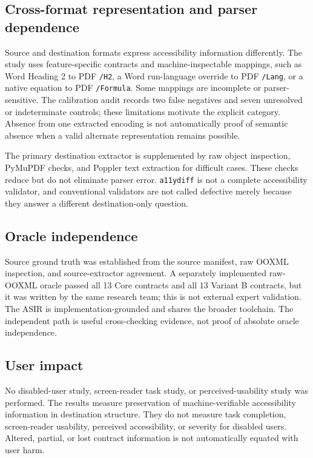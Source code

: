 \subsection{Cross-format representation and parser dependence}

Source and destination formats express accessibility information differently. The study uses feature-specific contracts and machine-inspectable mappings, such as Word Heading 2 to PDF \texttt{/H2}, a Word run-language override to PDF \texttt{/Lang}, or a native equation to PDF \texttt{/Formula}. Some mappings are incomplete or parser-sensitive. The calibration audit records two false negatives and seven unresolved or indeterminate controls; these limitations motivate the explicit \unresolved{} category. Absence from one extracted encoding is not automatically proof of semantic absence when a valid alternate representation remains possible.

The primary destination extractor is supplemented by raw object inspection, PyMuPDF checks, and Poppler text extraction for difficult cases. These checks reduce but do not eliminate parser error. \texttt{a11ydiff} is not a complete accessibility validator, and conventional validators are not called defective merely because they answer a different destination-only question.

\subsection{Oracle independence}

Source ground truth was established from the source manifest, raw OOXML inspection, and source-extractor agreement. A separately implemented raw-OOXML oracle passed all 13 Core contracts and all 13 Variant B contracts, but it was written by the same research team; this is not external expert validation. The ASIR is implementation-grounded and shares the broader toolchain. The independent path is useful cross-checking evidence, not proof of absolute oracle independence.

\subsection{User impact}

No disabled-user study, screen-reader task study, or perceived-usability study was performed. The results measure preservation of machine-verifiable accessibility information in destination structure. They do not measure task completion, screen-reader usability, perceived accessibility, or severity for disabled users. Altered, partial, or lost contract information is not automatically equated with user harm.

